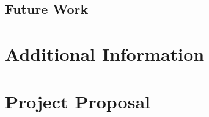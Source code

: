 \documentclass[12pt,a4paper,twoside,openright]{report}
\theoremstyle{definition}
\begin{document}
\section{Future Work}




\nocite{*}
% 




\appendix

\chapter{Additional Information}

%
%
%
%
%


\chapter{Project Proposal}
\label{chap:proposal}

\end{document}
